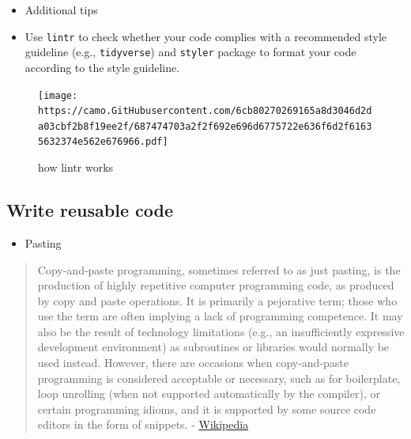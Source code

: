 \documentclass[
  letterpaper,
  DIV=11,
  numbers=noendperiod]{scrreprt}
\providecommand{\tightlist}{%
  \setlength{\itemsep}{0pt}\setlength{\parskip}{0pt}}\usepackage{longtable,booktabs,array}
\begin{document}
\begin{itemize}
\item
  Additional tips
\item
  Use \texttt{lintr} to check whether your code complies with a
  recommended style guideline (e.g., \texttt{tidyverse}) and
  \texttt{styler} package to format your code according to the style
  guideline.
\end{itemize}

\begin{figure}

{\centering \texttt{[image: https://camo.GitHubusercontent.com/6cb80270269165a8d3046d2da03cbf2b8f19ee2f/687474703a2f2f692e696d6775722e636f6d2f61635632374e562e676966.pdf]}

}

\caption{how lintr works}

\end{figure}

\hypertarget{write-reusable-code}{%
\subsection*{Write reusable code}\label{write-reusable-code}}

\begin{itemize}
\tightlist
\item
  Pasting
\end{itemize}

\begin{quote}
Copy-and-paste programming, sometimes referred to as just pasting, is
the production of highly repetitive computer programming code, as
produced by copy and paste operations. It is primarily a pejorative
term; those who use the term are often implying a lack of programming
competence. It may also be the result of technology limitations (e.g.,
an insufficiently expressive development environment) as subroutines or
libraries would normally be used instead. However, there are occasions
when copy-and-paste programming is considered acceptable or necessary,
such as for boilerplate, loop unrolling (when not supported
automatically by the compiler), or certain programming idioms, and it is
supported by some source code editors in the form of snippets. -
\href{https://en.wikipedia.org/wiki/Copy-and-paste_programming}{Wikipedia}
\end{quote}
\end{document}

